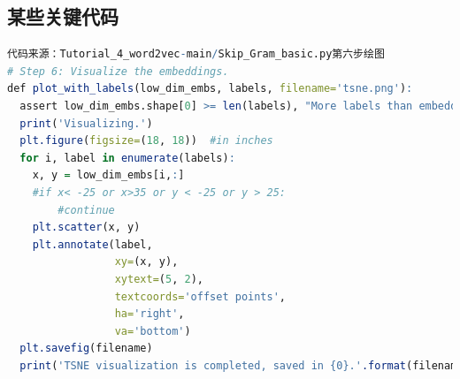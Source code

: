 \documentclass{article}
\begin{document}
\subsection{某些关键代码}

\begin{lstlisting}[language=R]
代码来源：Tutorial_4_word2vec-main/Skip_Gram_basic.py第六步绘图
# Step 6: Visualize the embeddings.
def plot_with_labels(low_dim_embs, labels, filename='tsne.png'):
  assert low_dim_embs.shape[0] >= len(labels), "More labels than embeddings"
  print('Visualizing.')
  plt.figure(figsize=(18, 18))  #in inches
  for i, label in enumerate(labels):
    x, y = low_dim_embs[i,:]
    #if x< -25 or x>35 or y < -25 or y > 25:
        #continue
    plt.scatter(x, y)
    plt.annotate(label,
                 xy=(x, y),
                 xytext=(5, 2),
                 textcoords='offset points',
                 ha='right',
                 va='bottom')
  plt.savefig(filename)
  print('TSNE visualization is completed, saved in {0}.'.format(filename))
\end{lstlisting} 
\end{document}
